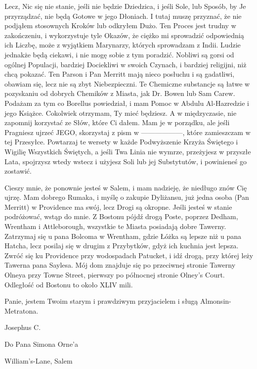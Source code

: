 \begin{displayquote}
Lecz, Nic się nie stanie, jeśli nie będzie Dziedzica, i jeśli Sole, lub Sposób, by Je przyrządzać, nie będą Gotowe w jego Dłoniach. I tutaj muszę przyznać, że nie podjąłem stosownych Kroków lub odkryłem Dużo. Ten Proces jest trudny w zakończeniu, i wykorzystuje tyle Okazów, że ciężko mi sprowadzić odpowiednią ich Liczbę, może z wyjątkiem Marynarzy, których sprowadzam z Indii. Ludzie jednakże będą ciekawi, i nie mogę sobie z tym poradzić. Nobliwi są gorsi od ogólnej Populacji, bardziej Dociekliwi w swoich Czynach, i bardziej religijni, niż chcą pokazać. Ten Parson i Pan Merritt mają nieco posłuchu i są gadatliwi, obawiam się, lecz nie są zbyt Niebezpieczni. Te Chemiczne substancje są łatwe w pozyskaniu od dobrych Chemików z Miasta, jak Dr. Bowen lub Sam Carew. Podażam za tym co Borellus powiedział, i mam Pomoc w Abdulu Al-Hazredzie i jego Książce. Cokolwiek otrzymam, Ty mieć będziesz. A w międzyczasie, nie zapomnij korzystać ze Słów, które Ci dałem. Mam je w porządku, ale jeśli Pragniesz ujrzeć JEGO, skorzystaj z pism w  ——————, które zamieszczam w tej Przesyłce. Powtarzaj te wersety w każde Podwyższenie Krzyża Świętego i Wigilię Wszystkich Świętych, a jeśli Twa Linia nie wymrze, przeżyjesz w przyszłe Lata, spojrzysz wtedy wstecz i użyjesz Soli lub jej Substytutów, i powinieneś go zostawić. 

Cieszy mnie, że ponownie jesteś w Salem, i mam nadzieję, że niedługo znów Cię ujrzę. Mam dobrego Rumaka, i myślę o zakupie Dyliżansu, już jedna osoba (Pan Merritt) w Providence ma swój, lecz Drogi są okropne. Jeśli jesteś w stanie podróżować, wstąp do mnie. Z Bostonu pójdź drogą Poste, poprzez Dedham, Wrentham i Attleborough, wszystkie te Miasta posiadają dobre Tawerny. Zatrzymaj się u pana Bolcoma w Wrentham, gdzie Łóżka są lepsze niż u pana Hatcha, lecz posilaj się w drugim z Przybytków, gdyż ich kuchnia jest lepsza. Zwróć się ku Providence przy wodospadach Patucket, i idź drogą, przy której leży Tawerna pana Saylesa. Mój dom znajduje się po przeciwnej stronie Tawerny Olneya przy Towne Street, pierwszy po północnej stronie Olney's Court. Odległość od Bostonu to około XLIV mili. 

Panie, jestem Twoim starym i prawdziwym przyjacielem i sługą Almonsin-Metratona.

\begin{flushright}
Josephus C.
\end{flushright}

Do Pana Simona Orne'a

William's-Lane, Salem

\end{displayquote}

